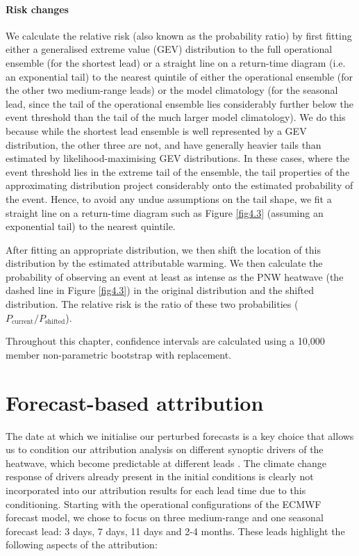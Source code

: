     \paragraph*{Risk changes}
  
      We calculate the relative risk (also known as the probability ratio) by first fitting either a generalised extreme value (GEV) distribution to the full operational ensemble (for the shortest lead) or a straight line on a return-time diagram (i.e. an exponential tail) to the nearest quintile of either the operational ensemble (for the other two medium-range leads) or the model climatology (for the seasonal lead, since the tail of the operational ensemble lies considerably further below the event threshold than the tail of the much larger model climatology). We do this because while the shortest lead ensemble is well represented by a GEV distribution, the other three are not, and have generally heavier tails than estimated by likelihood-maximising GEV distributions. In these cases, where the event threshold lies in the extreme tail of the ensemble, the tail properties of the approximating distribution project considerably onto the estimated probability of the event. Hence, to avoid any undue assumptions on the tail shape, we fit a straight line on a return-time diagram such as Figure \ref{fig4.3} (assuming an exponential tail) to the nearest quintile. 
  
      After fitting an appropriate distribution, we then shift the location of this distribution by the estimated attributable warming. We then calculate the probability of observing an event at least as intense as the PNW heatwave (the dashed line in Figure \ref{fig4.3}) in the original distribution and the shifted distribution. The relative risk is the ratio of these two probabilities ($P_\text{current} / P_\text{shifted}$).
  
      Throughout this chapter, confidence intervals are calculated using a 10,000 member non-parametric bootstrap with replacement.

\section{Forecast-based attribution}\label{ch4:attribution}

  The date at which we initialise our perturbed forecasts is a key choice that allows us to condition our attribution analysis on different synoptic drivers of the heatwave, which become predictable at different leads \cite{lin_2021_2022,mo_anomalous_2022}. The climate change response of drivers already present in the initial conditions is clearly not incorporated into our attribution results for each lead time due to this conditioning. Starting with the operational configurations of the ECMWF forecast model, we chose to focus on three medium-range and one seasonal forecast lead: 3 days, 7 days, 11 days and 2-4 months. These leads highlight the following aspects of the attribution: 

